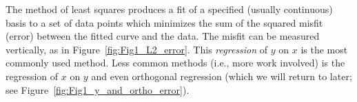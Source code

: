 	The method of least squares produces a fit of a specified (usually continuous) basis to a set of 
data points which minimizes the sum of the squared misfit (error) between the fitted curve 
and the data. The misfit can be measured vertically, as in Figure~\ref{fig:Fig1_L2_error}.
This \emph{regression} of $y$ on $x$ is the most commonly used method. Less common methods (i.e., more work 
involved) is the regression of $x$ on $y$ and even orthogonal regression (which we will return to later;
see Figure~\ref{fig:Fig1_y_and_ortho_error}).



